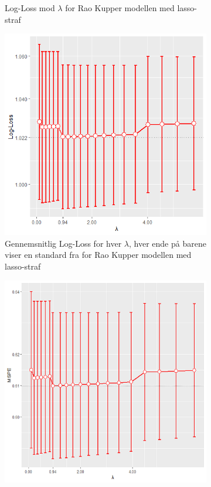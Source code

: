 \documentclass[11pt,a4paper]{article}
\begin{document}
\begin{figure}[h!]
\begin{subfigure}[b]{0.4\linewidth}
    \caption{Log-Loss mod $\lambda$ for Rao Kupper modellen med lasso-straf}
    \label{fig:LogLossStat}  
    \end{subfigure}
  \begin{subfigure}[b]{0.4\linewidth}
    \includegraphics[width=\textwidth]{STATLOGLOSSBARNY1.png}
    \caption{Gennemsnitlig Log-Loss for hver $\lambda$, hver ende på barene viser en standard fra  for Rao Kupper modellen med lasso-straf}
    \label{fig:LogLossBarStat}  
    \end{subfigure}
  \begin{subfigure}[b]{0.4\linewidth}
    \includegraphics[width=\textwidth]{MSPEBARPLOTSTATNY1.png}

\end{subfigure}
\end{figure}
\end{document}
